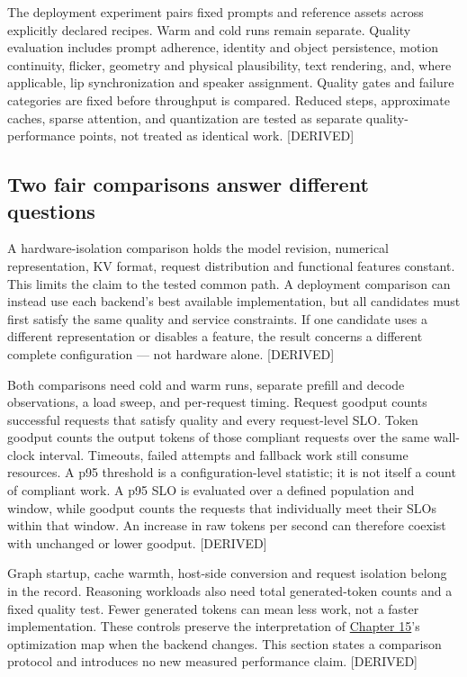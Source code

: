 The deployment experiment pairs fixed prompts and reference assets
across explicitly declared recipes. Warm and cold runs remain separate.
Quality evaluation includes prompt adherence, identity and object
persistence, motion continuity, flicker, geometry and physical
plausibility, text rendering, and, where applicable, lip synchronization
and speaker assignment. Quality gates and failure categories are fixed
before throughput is compared. Reduced steps, approximate caches, sparse
attention, and quantization are tested as separate quality-performance
points, not treated as identical work. \mbox{{[}DERIVED{]}}

\subsection{Two fair comparisons answer different
questions}\label{two-fair-comparisons-answer-different-questions}

A hardware-isolation comparison holds the model revision, numerical
representation, KV format, request distribution and functional features
constant. This limits the claim to the tested common path. A deployment
comparison can instead use each backend's best available implementation,
but all candidates must first satisfy the same quality and service
constraints. If one candidate uses a different representation or
disables a feature, the result concerns a different complete
configuration --- not hardware alone. \mbox{{[}DERIVED{]}}

Both comparisons need cold and warm runs, separate prefill and decode
observations, a load sweep, and per-request timing. Request goodput
counts successful requests that satisfy quality and every request-level
SLO. Token goodput counts the output tokens of those compliant requests
over the same wall-clock interval. Timeouts, failed attempts and
fallback work still consume resources. A p95 threshold is a
configuration-level statistic; it is not itself a count of compliant
work. A p95 SLO is evaluated over a defined population and window, while
goodput counts the requests that individually meet their SLOs within
that window. An increase in raw tokens per second can therefore coexist
with unchanged or lower goodput. \mbox{{[}DERIVED{]}}

Graph startup, cache warmth, host-side conversion and request isolation
belong in the record. Reasoning workloads also need total
generated-token counts and a fixed quality test. Fewer generated tokens
can mean less work, not a faster implementation. These controls preserve
the interpretation of \hyperref[chap:15]{Chapter 15}'s optimization map when the backend
changes. This section states a comparison protocol and introduces no new
measured performance claim. \mbox{{[}DERIVED{]}}


